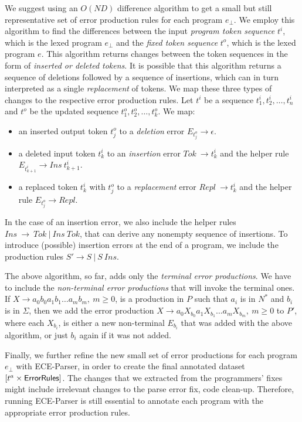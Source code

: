 We suggest using an $O(ND)$ difference algorithm to get a small but still
representative set of error production rules for each program $e_{\bot}$. We
employ this algorithm to find the differences between the input
\emph{program token sequence} $t^i$, which is the lexed program $e_{\bot}$ and
the \emph{fixed token sequence} $t^o$, which is the lexed program $e$. This
algorithm returns changes between the token sequences in the form of
\emph{inserted or deleted tokens}. It is possible that this algorithm returns a
sequence of deletions followed by a sequence of insertions, which can in turn
interpreted as a single \emph{replacement} of tokens. We map these three types
of changes to the respective error production rules. Let $t^i$ be a sequence
$t^i_1, t^i_2, \dots, t^i_n$ and $t^o$ be the updated sequence $t^o_1, t^o_2,
\dots, t^o_k$. We map:
\begin{itemize}
    \item an inserted output token $t^o_j$ to a \emph{deletion} error $E_{t^o_j}
    \rightarrow \epsilon$.
    \item a deleted input token $t^i_k$ to an \emph{insertion} error $Tok\
    \rightarrow t^i_k$ and the helper rule $E_{t^i_{k+1}} \rightarrow Ins\
    t^i_{k+1}$.
    \item a replaced token $t^i_k$ with $t^o_j$ to a \emph{replacement} error
    $Repl\ \rightarrow t^i_k$ and the helper rule $E_{t^o_j} \rightarrow Repl$.
\end{itemize}

In the case of an insertion error, we also include the helper rules $Ins\
\rightarrow\ Tok\ \vert\ Ins\ Tok$, that can derive any nonempty sequence of
insertions. To introduce (possible) insertion errors at the end of a program, we
include the production rules $S' \rightarrow S\ \vert\ S\ Ins$.

The above algorithm, so far, adds only the \emph{terminal error productions}. We
have to include the \emph{non-terminal error productions} that will invoke the
terminal ones. If $X \rightarrow a_0b_0a_1b_1 \dots a_mb_m,\ m \geq 0$, is a
production in $P$ such that $a_i$ is in $N^*$ and $b_i$ is in $\Sigma$, then we
add the error production $X \rightarrow a_0X_{b_0}a_1X_{b_1} \dots a_mX_{b_m},\
m \geq 0$ to $P'$, where each $X_{b_i}$, is either a new non-terminal $E_{b_i}$
that was added with the above algorithm, or just $b_i$ again if it was not
added.

Finally, we further refine the new small set of error productions for each
program $e_{\bot}$ with ECE-Parser, in order to create the final annotated
dataset $[t^a \times \mathsf{ErrorRules}]$. The changes that we extracted from
the programmers' fixes might include irrelevant changes to the parse error fix,
\eg code clean-up. Therefore, running ECE-Parser is still essential to annotate
each program with the appropriate error production rules.


